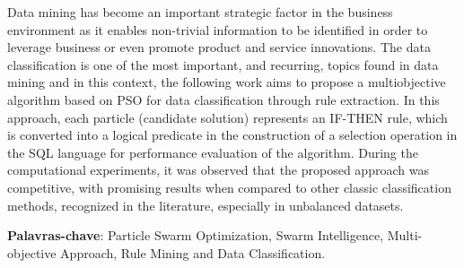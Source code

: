 \begin{resumo}[Abstract]
Data mining has become an important strategic factor in the business environment as it enables non-trivial information to be identified in order to leverage business or even promote product and service innovations. The data classification is one of the most important, and recurring, topics found in data mining and in this context, the following work aims to propose a multiobjective algorithm based on PSO for data classification through rule extraction. In this approach, each particle (candidate solution) represents an IF-THEN rule, which is converted into a logical predicate in the construction of a selection operation in the SQL language for performance evaluation of the algorithm. During the computational experiments, it was observed that the proposed approach was competitive, with promising results when compared to other classic classification methods, recognized in the literature, especially in unbalanced datasets.

\vspace{1.5ex}

\noindent \textbf{Palavras-chave}: Particle Swarm Optimization, Swarm Intelligence, Multi-objective Approach, Rule Mining and Data Classification. 
\end{resumo}
